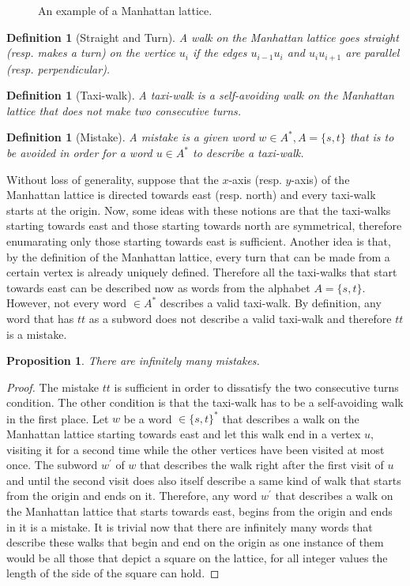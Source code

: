 \documentclass[12pt]{report}
\newtheorem{prop}{Proposition}
\newtheorem{defn}[mythm]{Definition}
\begin{document}
{{\begin{figure}[ht]
An example of a Manhattan lattice.
\end{figure}

\begin{defn}[Straight and Turn]
A walk on the Manhattan lattice goes straight (resp. makes a turn) on the vertice $u_i$ if the edges $u_{i-1} u_i$ and $u_i u_{i+1}$ are parallel (resp. perpendicular).
\end{defn}

\begin{defn}[Taxi-walk]
A taxi-walk is a self-avoiding walk on the Manhattan lattice that does not make two consecutive turns.
\end{defn}

\begin{defn}[Mistake]
A mistake is a given word $w \in A^*, A=\{s,t\}$ that is to be avoided in order for a word $u \in A^*$ to describe a taxi-walk.
\end{defn}

\noindent Without loss of generality, suppose that the $x$-axis (resp. $y$-axis) of the Manhattan lattice is directed towards east (resp. north) and every taxi-walk starts at the origin. Now, some ideas with these notions are that the taxi-walks starting towards east and those starting towards north are symmetrical, therefore enumarating only those starting towards east is sufficient. Another idea is that, by the definition of the Manhattan lattice, every turn that can be made from a certain vertex is already uniquely defined. Therefore all the taxi-walks that start towards east can be described now as words from the alphabet $A=\{s,t\}$. However, not every word $\in A^*$ describes a valid taxi-walk. By definition, any word that has $tt$ as a subword does not describe a valid taxi-walk and therefore $tt$ is a mistake.

\begin{prop}There are infinitely many mistakes.
\end{prop}
\begin{proof}
The mistake $tt$ is sufficient in order to dissatisfy the two consecutive turns condition. The other condition is that the taxi-walk has to be a self-avoiding walk in the first place. Let $w$ be a word $\in \{s,t\}^*$ that describes a walk on the Manhattan lattice starting towards east and let this walk end in a vertex $u$, visiting it for a second time while the other vertices have been visited at most once. The subword $w^{\prime}$ of $w$ that describes the walk right after the first visit of $u$ and until the second visit does also itself describe a same kind of walk that starts from the origin and ends on it. Therefore, any word $w^{\prime}$ that describes a walk on the Manhattan lattice that starts towards east, begins from the origin and ends in it is a mistake. It is trivial now that there are infinitely many words that describe these walks that begin and end on the origin as one instance of them would be all those that depict a square on the lattice, for all integer values the length of the side of the square can hold.
\end{proof}

}}
\end{document}
